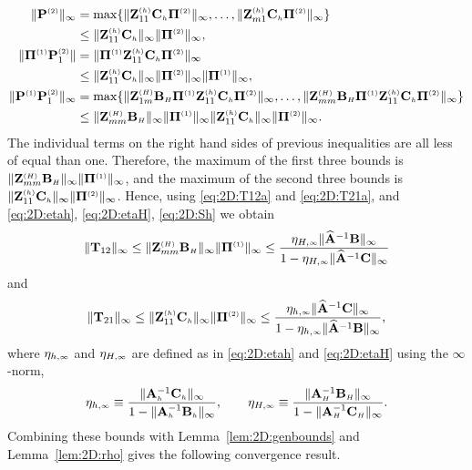 \begin{align*}
\|\PTwo\|_{\infty} &=\max\{ \|\Z_{11}^{\klein{(h)}}\matCh\PiTwo\|_{\infty},
\dots, \|\Z_{m1}^{\klein{(h)}}\matCh\PiTwo\|_{\infty}\}\\
&\leq \|\Z_{11}^{\klein{(h)}}\matCh\|_{\infty} \| \PiTwo \|_{\infty},\\
\|\PiOne\PTwo_1\| & =
\| \PiOne \Z_{11}^{\klein{(h)}}\matCh\PiTwo \|_{\infty} \\
&\leq  \|\Z_{11}^{\klein{(h)}}\matCh\|_{\infty} \| \PiTwo \|_{\infty}
\|\PiOne\|_{\infty}, \\
\|\POne \PTwo_1\|_{\infty} &= \max\{ \|\Z_{1m}^{\klein{(H)}}\matBH \PiOne
\Z_{11}^{\klein{(h)}}\matCh \PiTwo\|_{\infty},
\dots,\| \Z_{mm}^{\klein{(H)}}\matBH \PiOne
\Z_{11}^{\klein{(h)}}\matCh\PiTwo\|_{\infty} \}\\
&\leq \|\Z_{mm}^{\klein{(H)}}\matBH\|_{\infty} \|\PiOne\|_{\infty}
\|\Z_{11}^{\klein{(h)}}\matCh\|_{\infty}   \|\PiTwo\|_{\infty}.
\end{align*}
%
The individual terms on the right hand sides of previous inequalities are all
less of equal than one. Therefore, the maximum of the first three bounds is
$\|\Z_{mm}^{\klein{(H)}}\matBH\|_{\infty} \| \PiOne \|_{\infty}$, and the
maximum of the second three bounds is $\|\Z_{11}^{\klein{(h)}}\matCh\|_{\infty}
\| \PiTwo \|_{\infty}$. Hence, using \eqref{eq:2D:T12a} and \eqref{eq:2D:T21a}, and
\eqref{eq:2D:etah}, \eqref{eq:2D:etaH}, \eqref{eq:2D:Sh} we obtain
%
$$
	\| \T_{12} \|_{\infty} \leq \|\Z_{mm}^{\klein{(H)}}\matBH\|_{\infty}
  \| \PiOne \|_{\infty} \leq
	\frac{\eta_{H,\klein{\infty}}\|\matA^{-1}\matB\|_{\infty}}
  {1-\eta_{H,\klein{\infty}} \|\matA^{-1}\matC\|_{\infty}}
$$
and
$$
	\| \T_{21} \|_{\infty} \leq \|\Z_{11}^{\klein{(h)}}\matCh\|_{\infty}
  \| \PiTwo \|_{\infty} \leq
	\frac{\eta_{h,\klein{\infty}}\|\matA^{-1}\matC\|_{\infty}}
  {1-\eta_{h,\klein{\infty}} \|\matA^{-1}\matB\|_{\infty}},
$$
where $\eta_{h,\klein{\infty}}$ and $\eta_{H,\klein{\infty}}$ are defined as in
\eqref{eq:2D:etah} and \eqref{eq:2D:etaH} using the $\infty$-norm,
\begin{equation}\label{eq:2D:etas}
\eta_{h,\klein{\infty}} \equiv \frac{\|\matAh^{-1}\matCh\|_{\infty}}
{1-\|\matAh^{-1}\matBh\|_{\infty}},
\qquad
\eta_{H,\klein{\infty}} \equiv \frac{\|\matAH^{-1}\matBH\|_{\infty}}
{1-\|\matAH^{-1}\matCH\|_{\infty}}.
\end{equation}
%
Combining these bounds with Lemma~\ref{lem:2D:genbounds} and
Lemma~\ref{lem:2D:rho} gives the following convergence result.

